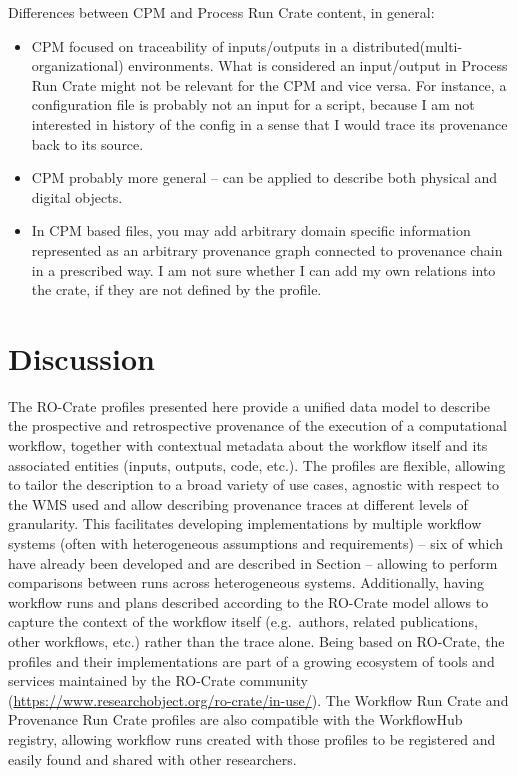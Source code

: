 \documentclass[10pt,letterpaper]{article}
\begin{document}
Differences between CPM and Process Run Crate content, in general:

\begin{itemize}
  \item 
CPM focused on traceability of inputs/outputs in a distributed(multi-organizational) environments. What is considered an input/output in Process Run Crate might not be relevant for the CPM and vice versa. For instance, a configuration file is probably not an input for a script, because I am not interested in history of the config in a sense that I would trace its provenance back to its source.
\item CPM probably more general – can be applied to describe both physical and digital objects. 
\item In CPM based files, you may add arbitrary domain specific information represented as an arbitrary provenance graph connected to provenance chain in a prescribed way. I am not sure whether I can add my own relations into the crate, if they are not defined by the profile. 
\end{itemize}


%
\section{Discussion}\label{discussion}


The RO-Crate profiles presented here provide a unified data model to describe the prospective and retrospective provenance of the execution of a computational workflow, together with contextual metadata about the workflow itself and its associated entities (inputs, outputs, code, etc.). 
The profiles are flexible, allowing to tailor the description to a broad variety of use cases, agnostic with respect to the WMS used and allow describing provenance traces at different levels of granularity. 
This facilitates developing implementations by multiple workflow systems (often with heterogeneous assumptions and requirements) -- six of which have already been developed and are described in Section  -- allowing to perform comparisons between runs across heterogeneous systems.
Additionally, having workflow runs and plans described according to the RO-Crate model allows to capture the context of the workflow itself (e.g.~authors, related publications, other workflows, etc.) rather than the trace alone. 
Being based on RO-Crate, the profiles and their implementations are part of a growing ecosystem of tools and services maintained by the RO-Crate community (\url{https://www.researchobject.org/ro-crate/in-use/}).
The Workflow Run Crate and Provenance Run Crate profiles are also compatible with the WorkflowHub registry, allowing workflow runs created with those profiles to be registered and easily found and shared with other researchers.
\end{document}
